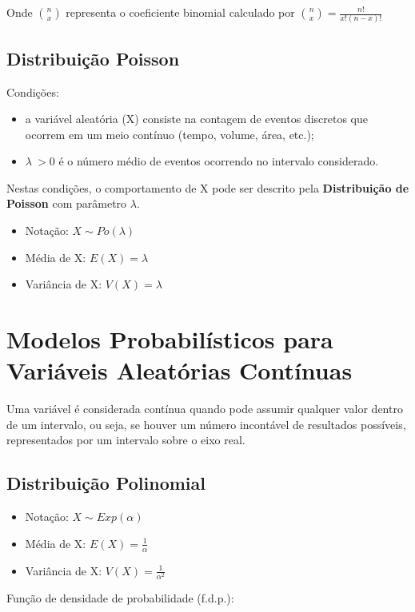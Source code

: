 Onde \( \binom{n}{x} \) representa o coeficiente binomial calculado por \( \binom{n}{x} = \frac{n!}{x!(n-x)!}\) 

\subsection{Distribuição Poisson}

Condições:
\begin{itemize}
	\item a variável aleatória (X) consiste na contagem de eventos discretos que ocorrem em um meio contínuo (tempo, volume, área, etc.);
	\item \( \lambda \ > 0 \) é o número médio de eventos ocorrendo no intervalo considerado.
\end{itemize}

Nestas condições, o comportamento de X pode ser descrito pela \textbf{Distribuição de Poisson} com parâmetro 
\( \lambda \). 

\begin{itemize}
	\item Notação: \(X \sim Po( \lambda ) \)
	\item Média de X: \( E(X) = \lambda \)
	\item Variância de X: \( V(X) = \lambda \)
\end{itemize}

\section{Modelos Probabilísticos para Variáveis Aleatórias Contínuas}

Uma variável é considerada contínua quando pode assumir qualquer valor dentro de um intervalo, ou seja, se houver um número incontável de resultados possíveis, representados por um intervalo sobre o eixo real.

\subsection{Distribuição Polinomial}

\begin{itemize}
	\item Notação: \(X \sim Exp( \alpha ) \)
	\item Média de X: \( E(X) = \frac{1}{\alpha} \)
	\item Variância de X: \( V(X) = \frac{1}{\alpha^2} \)
\end{itemize}

Função de densidade de probabilidade (f.d.p.):

